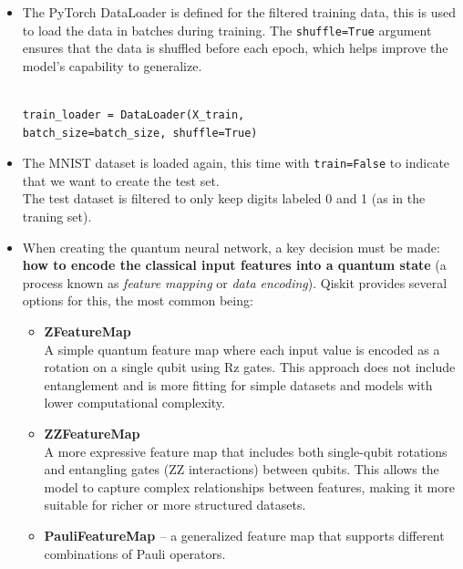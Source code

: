 \documentclass[conference]{IEEEtran}
\begin{document}
\begin{itemize}
    \item The PyTorch DataLoader \cite{DataLoader} is defined for the filtered training data, this is used to load the data in batches during training. The \texttt{shuffle=True} argument ensures that the data is shuffled before each epoch, which helps improve the model's capability to generalize.
{\raggedright
\small
\begin{verbatim}

train_loader = DataLoader(X_train, 
batch_size=batch_size, shuffle=True)

\end{verbatim}
}


    \item The MNIST dataset is loaded again, this time with \texttt{train=False} to indicate that we want to create the test set.\\
        The test dataset is filtered to only keep digits labeled 0 and 1 (as in the traning set).\\



    \item When creating the quantum neural network, a key decision must be made:  
        \textbf{how to encode the classical input features into a quantum state} (a process known as \textit{feature mapping} or \textit{data encoding}).
        Qiskit provides several options for this, the most common being:
        

        \begin{itemize}
            \item \textbf{ZFeatureMap \cite{qiskit_zfeaturemap}} \\
            A simple quantum feature map where each input value is encoded as a rotation on a single qubit using Rz gates. This approach does not include entanglement and is more fitting for simple datasets and models with lower computational complexity.
        
            \item \textbf{ZZFeatureMap \cite{qiskit_zzfeaturemap}} \\
            A more expressive feature map that includes both single-qubit rotations and entangling gates (ZZ interactions) between qubits. This allows the model to capture complex relationships between features, making it more suitable for richer or more structured datasets.
            
            \item \textbf{PauliFeatureMap \cite{qiskit_paulifeaturemap}} – a generalized feature map that supports different combinations of Pauli operators.


\end{itemize}
\end{itemize}
\end{document}
